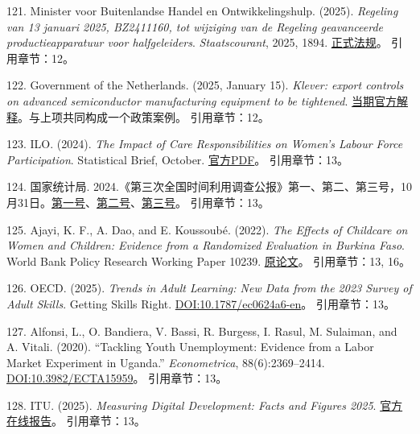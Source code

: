 \documentclass[UTF8,fontset=windows,12pt,a4paper,oneside,openany]{ctexbook}
\begin{document}
121. Minister voor Buitenlandse Handel en Ontwikkelingshulp. (2025). \emph{Regeling van 13 januari 2025, BZ2411160, tot wijziging van de Regeling geavanceerde productieapparatuur voor halfgeleiders}. \emph{Staatscourant}, 2025, 1894. \href{https://zoek.officielebekendmakingen.nl/stcrt-2025-1894.pdf}{正式法规}。
引用章节：12。

122. Government of the Netherlands. (2025, January 15). \emph{Klever: export controls on advanced semiconductor manufacturing equipment to be tightened}. \href{https://www.government.nl/latest/news/2025/01/15/klever-export-controls-on-advanced-semiconductor-manufacturing-equipment-to-be-tightened}{当期官方解释}。与上项共同构成一个政策案例。
引用章节：12。

123. ILO. (2024). \emph{The Impact of Care Responsibilities on Women’s Labour Force Participation}. Statistical Brief, October. \href{https://www.ilo.org/sites/default/files/2024-10/GEDI-STAT\%20brief_formatted_28.10.24_final.pdf}{官方PDF}。
引用章节：13。

124. 国家统计局. 2024.《第三次全国时间利用调查公报》第一、第二、第三号，10月31日。\href{https://www.stats.gov.cn/xxgk/sjfb/zxfb2020/202410/t20241031_1957217.html}{第一号}、\href{https://www.stats.gov.cn/xxgk/sjfb/zxfb2020/202410/t20241031_1957216.html}{第二号}、\href{https://www.stats.gov.cn/xxgk/sjfb/zxfb2020/202410/t20241031_1957215.html}{第三号}。
引用章节：13。

125. Ajayi, K. F., A. Dao, and E. Koussoubé. (2022). \emph{The Effects of Childcare on Women and Children: Evidence from a Randomized Evaluation in Burkina Faso}. World Bank Policy Research Working Paper 10239. \href{https://documents1.worldbank.org/curated/en/099215111282254210/pdf/IDU09ee54b690865904f71089a60d76ad621601c.pdf}{原论文}。
引用章节：13, 16。

126. OECD. (2025). \emph{Trends in Adult Learning: New Data from the 2023 Survey of Adult Skills}. Getting Skills Right. \href{https://doi.org/10.1787/ec0624a6-en}{DOI:10.1787/ec0624a6-en}。
引用章节：13。

127. Alfonsi, L., O. Bandiera, V. Bassi, R. Burgess, I. Rasul, M. Sulaiman, and A. Vitali. (2020). “Tackling Youth Unemployment: Evidence from a Labor Market Experiment in Uganda.” \emph{Econometrica}, 88(6):2369–2414. \href{https://doi.org/10.3982/ECTA15959}{DOI:10.3982/ECTA15959}。
引用章节：13。

128. ITU. (2025). \emph{Measuring Digital Development: Facts and Figures 2025}. \href{https://www.itu.int/itu-d/reports/statistics/facts-figures-2025/}{官方在线报告}。
引用章节：13。
\end{document}
